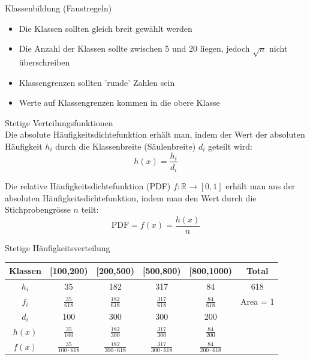 \begin{concept}{Klassenbildung (Faustregeln)}\\
\begin{itemize}
  \item Die Klassen sollten gleich breit gewählt werden
  \item Die Anzahl der Klassen sollte zwischen 5 und 20 liegen, jedoch $\sqrt{n}$ nicht überschreiben
  \item Klassengrenzen sollten 'runde' Zahlen sein
  \item Werte auf Klassengrenzen kommen in die obere Klasse
\end{itemize}
\end{concept}

\begin{definition}{Stetige Verteilungsfunktionen}\\
Die absolute Häufigkeitsdichtefunktion erhält man, indem der Wert der absoluten Häufigkeit $h_i$ durch die Klassenbreite (Säulenbreite) $d_i$ geteilt wird:
$$h(x) = \frac{h_i}{d_i}$$

Die relative Häufigkeitsdichtefunktion (PDF) $f: \mathbb{R} \rightarrow [0,1]$ erhält man aus der absoluten Häufigkeitsdichtefunktion, indem man den Wert durch die Stichprobengrösse $n$ teilt:
$$\text{PDF} = f(x) = \frac{h(x)}{n}$$
\end{definition}

\begin{example2}{Stetige Häufigkeitsverteilung}
\renewcommand{\arraystretch}{2}%
\begin{center}
\begin{tabular}{|c|c|c|c|c|c|}
\hline
Klassen & [100,200) & [200,500) & [500,800) & [800,1000) & Total \\
\hline
$h_i$ & 35 & 182 & 317 & 84 & 618 \\
\hline
$f_i$ & $\frac{35}{618}$ & $\frac{182}{618}$ & $\frac{317}{618}$ & $\frac{84}{618}$ & Area = 1 \\
\hline
$d_i$ & 100 & 300 & 300 & 200 & \\
\hline
$h(x)$ & $\frac{35}{100}$ & $\frac{182}{300}$ & $\frac{317}{300}$ & $\frac{84}{200}$ & \\
\hline
$f(x)$ & $\frac{35}{100 \cdot 618}$ & $\frac{182}{300 \cdot 618}$ & $\frac{317}{300 \cdot 618}$ & $\frac{84}{200 \cdot 618}$ & \\
\hline
\end{tabular}
\end{center}
\end{example2}





